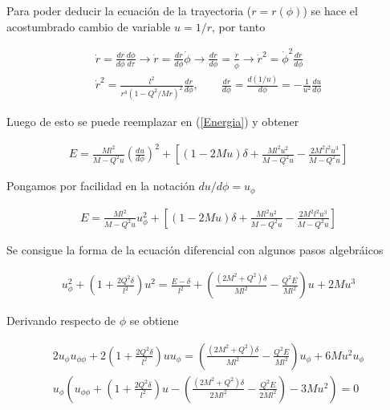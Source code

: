 \documentclass[DIN, pagenumber=false, fontsize=11pt, parskip=half]{scrartcl}
\begin{document}
Para poder deducir la ecuación de la trayectoria ($r = r(\phi)$) se hace el acostumbrado cambio de variable $u = 1/r$, por tanto 

\begin{eqnarray*}
    \dot{r} = \frac{dr}{d\phi}\frac{d\phi}{d\tau} \rightarrow \dot{r} = \frac{dr}{d\phi}\dot{\phi}\rightarrow\frac{dr}{d\phi} = \frac{\dot{r}}{\dot{\phi}} \rightarrow \dot{r}^{2} = \dot{\phi}^{2}\frac{dr}{d\phi}\\
    \dot{r}^{2} = \frac{l^{2}}{r^{4}(1-Q^{2}/Mr)^{2}}\frac{dr}{d\phi}, \qquad \frac{dr}{d\phi} = \frac{d(1/u)}{d\phi} = -\frac{1}{u^{2}}\frac{du}{d\phi}
\end{eqnarray*}

Luego de esto se puede reemplazar en (\ref{Energia}) y obtener

\begin{eqnarray*}
    E = \frac{Ml^{2}}{M-Q^{2}u}\left(\frac{du}{d\phi}\right)^{2}+\left[(1-2Mu)\delta +\frac{Ml^{2}u^{2}}{M-Q^{2}u}-\frac{2M^{2}l^{2}u^{3}}{M-Q^{2}u}\right]
\end{eqnarray*}

Pongamos por facilidad en la notación $du/d\phi = u_{\phi}$

\begin{eqnarray*}
    E = \frac{Ml^{2}}{M-Q^{2}u}u_{\phi}^{2}+\left[(1-2Mu)\delta +\frac{Ml^{2}u^{2}}{M-Q^{2}u}-\frac{2M^{2}l^{2}u^{3}}{M-Q^{2}u}\right]
\end{eqnarray*}

Se consigue la forma de la ecuación diferencial con algunos pasos algebráicos

\begin{eqnarray*}
    u_{\phi}^{2} + \left(1+\frac{2Q^{2}\delta}{l^{2}}\right)u^{2} = \frac{E-\delta}{l^{2}}+\left(\frac{(2M^{2}+Q^{2})\delta}{Ml^{2}}-\frac{Q^{2}E}{Ml^{2}}\right)u + 2Mu^{3}
\end{eqnarray*}

Derivando respecto de $\phi$ se obtiene

\begin{eqnarray*}
    2u_{\phi}u_{\phi\phi} + 2\left(1+\frac{2Q^{2}\delta}{l^{2}}\right)uu_{\phi} = \left(\frac{(2M^{2}+Q^{2})\delta}{Ml^{2}}-\frac{Q^{2}E}{Ml^{2}}\right)u_{\phi} + 6Mu^{2}u_{\phi}\\
    u_{\phi}\left(u_{\phi\phi} + \left(1+\frac{2Q^{2}\delta}{l^{2}}\right)u- \left(\frac{(2M^{2}+Q^{2})\delta}{2Ml^{2}}-\frac{Q^{2}E}{2Ml^{2}}\right) -3Mu^{2}\right) = 0
\end{eqnarray*}
\end{document}
